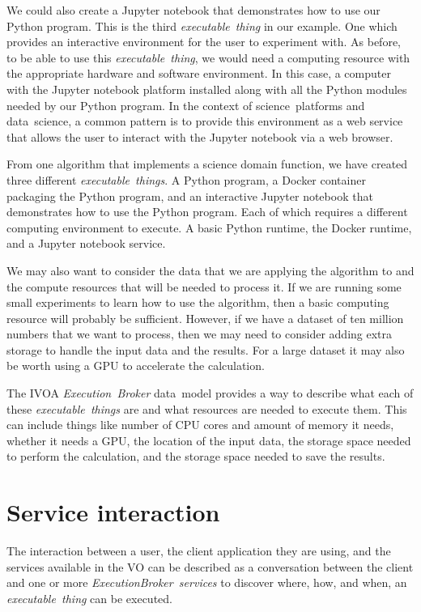 \documentclass[11pt,a4paper]{ivoa}
\newcommand{\datamodel} {data~model}
\newcommand{\webservice} {web service}
\newcommand{\webbrowser} {web browser}
\newcommand{\vo} {VO}
\newcommand{\ivoa} {IVOA}
\newcommand{\execbrokerservice}[1] {\textit{ExecutionBroker~service#1}}
\newcommand{\executionbroker} {\textit{Execution~Broker}}
\newcommand{\executablething}[1] {\textit{executable~thing#1}}
\newcommand{\jupyternotebook} {Jupyter notebook}
\newcommand{\python} {Python}
\newcommand{\pythonprogram} {Python program}
\newcommand{\dockerruntime} {Docker runtime}
\newcommand{\dockercontainer} {Docker container}
\newcommand{\dataset}[1] {dataset#1}
\newcommand{\datascience} {data~science}
\newcommand{\scienceplatform}[1] {science~platform#1}
\newcommand{\cpu}[1] {CPU#1}
\newcommand{\gpu}[1] {GPU#1}
\begin{document}
We could also create a \jupyternotebook{} that demonstrates how to use our \pythonprogram{}.
This is the third \executablething{} in our example.
One which provides an interactive environment for the user to experiment with.
As before, to be able to use this \executablething{}, we would need a computing resource with
the appropriate hardware and software environment.
In this case, a computer with the \jupyternotebook{} platform installed along with all the \python{} modules
needed by our \pythonprogram{}.
In the context of \scienceplatform{s} and \datascience{}, a common pattern is to provide this environment as a \webservice{}
that allows the user to interact with the \jupyternotebook{} via a \webbrowser.

From one algorithm that implements a science domain function, we have created three different \executablething{s}.
A \pythonprogram{}, a \dockercontainer{} packaging the \pythonprogram{}, and an interactive \jupyternotebook{}
that demonstrates how to use the \pythonprogram{}.
Each of which requires a different computing environment to execute.
A basic \python{} runtime, the \dockerruntime{}, and a \jupyternotebook{} service.

We may also want to consider the data that we are applying the algorithm to and the compute resources that
will be needed to process it.
If we are running some small experiments to learn how to use the algorithm, then a basic computing
resource will probably be sufficient.
However, if we have a \dataset{} of ten million numbers that we want to process, then we may
need to consider adding extra storage to handle the input data and the results.
For a large \dataset{} it may also be worth using a \gpu{} to accelerate the calculation.

The \ivoa{} \executionbroker{} \datamodel{} provides a way to describe what each of these \executablething{s}
are and what resources are needed to execute them.
This can include things like number of \cpu{} cores and amount of memory it needs,
whether it needs a \gpu{}, the location of the input data, the storage space needed to perform
the calculation, and the storage space needed to save the results.

\section{Service interaction}
\label{service-interaction}

The interaction between a user, the client application they are using, and the services available in the \vo{}
can be described as a conversation between the client and one or more \execbrokerservice{s} to discover
where, how, and when, an \executablething{} can be executed.
\end{document}
